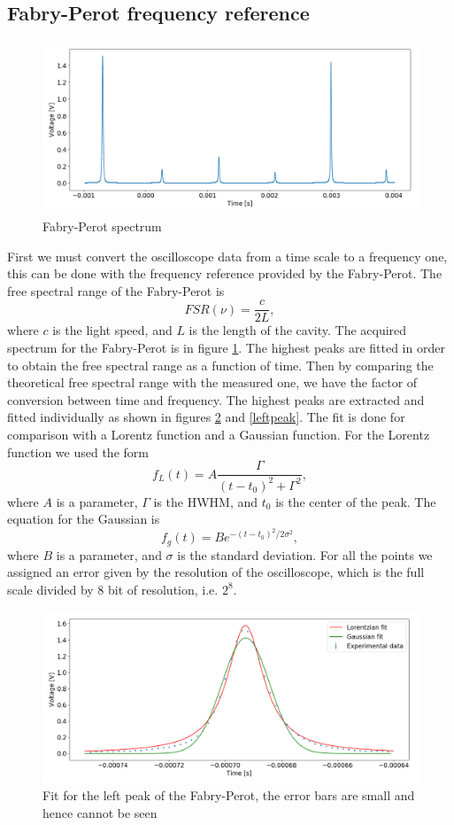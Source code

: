\documentclass[a4paper,10pt]{article}
\begin{document}
\subsection{Fabry-Perot frequency reference}
\begin{figure}[H]
        \includegraphics[width=\textwidth]{fabryperot.png}
\caption{Fabry-Perot spectrum}\label{fabryperot}
\end{figure}
First we must convert the oscilloscope data from a time scale to a frequency one, this can be done with the frequency reference provided by the Fabry-Perot. The free spectral range of the Fabry-Perot is
\begin{equation}\label{fsr}FSR(\nu)= \frac{c}{2L},\end{equation}
where $c$ is the light speed, and $L$ is the length of the cavity. The acquired spectrum for the Fabry-Perot is in figure \ref{fabryperot}. The highest peaks are fitted in order to obtain the free spectral range as a function of time. Then by comparing the theoretical free spectral range with the measured one, we have the factor of conversion between time and frequency. The highest peaks are extracted and fitted individually as shown in figures \ref{rightpeak} and \ref{leftpeak}. The fit is done for comparison with a Lorentz function and a Gaussian function. For the Lorentz function we used the form
\[f_L(t) = A \frac{\Gamma}{(t-t_0)^2 + \Gamma^2},\]
where $A$ is a parameter, $\Gamma$ is the HWHM, and $t_0$ is the center of the peak. The equation for the Gaussian is
\[ f_g(t) = Be^{-(t - t_0)^2/2\sigma^2},\]
where $B$ is a parameter, and $\sigma$ is the standard deviation. For all the points we assigned an error given by the resolution of the oscilloscope, which is the full scale divided by 8 bit of resolution, i.e. $2^8$.
\begin{figure}[H]
    \centering
     \includegraphics[width=\textwidth]{peak1fabry.png}
    \caption{Fit for the left peak of the Fabry-Perot, the error bars are small and hence cannot be seen}\label{rightpeak}
\end{figure}
\end{document}
